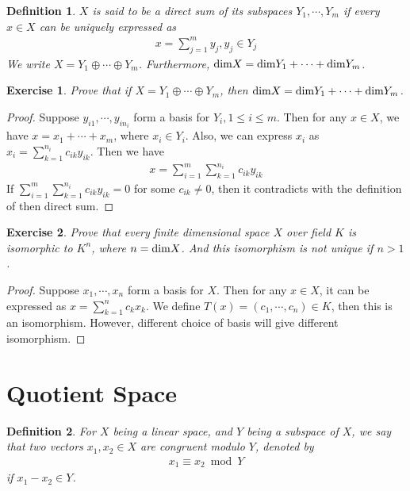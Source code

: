 \documentclass[11pt]{book}
\newtheorem{definition}{Definition}[section]
\newtheorem{exercise}{Exercise}[section]
\theoremstyle{definition}
\numberwithin{equation}{subsection}
\begin{document}
\medskip

\begin{definition}
$X$ is said to be a direct sum of its subspaces $Y_1, \cdots, Y_m$ if every $x\in X$ can be uniquely expressed as
\begin{align*}
    x = \sum^m_{j=1}y_j, y_j\in Y_j
\end{align*}
We write $X = Y_1 \oplus \cdots \oplus Y_m$. Furthermore, ${\rm dim}X = {\rm dim}Y_1 +\cdots + {\rm dim}Y_m$.
\end{definition}

\medskip

\begin{exercise}
Prove that if $X = Y_1 \oplus \cdots \oplus Y_m$, then ${\rm dim}X = {\rm dim}Y_1 +\cdots + {\rm dim}Y_m$.
\end{exercise}
\begin{proof}
Suppose $y_{i1}, \cdots, y_{in_i}$ form a basis for $Y_i, 1\leq i\leq m$. Then for any $x\in X$, we have $x = x_1 +\cdots +x_m$, where $x_i\in Y_i$. Also, we can express $x_i$ as $x_i = \sum^{n_i}_{k=1}c_{i k} y_{i k}$. Then we have 
\begin{align*}
    x = \sum^m_{i=1}\sum^{n_i}_{k=1}c_{i k} y_{i k}
\end{align*}
If $\sum^m_{i=1}\sum^{n_i}_{k=1}c_{i k} y_{i k} = 0$ for some $c_{ik}\neq 0$, then it contradicts with the definition of then direct sum.
\end{proof}

\medskip

\begin{exercise}
Prove that every finite dimensional space $X$ over field $K$ is isomorphic to $K^n$, where $n = {\rm dim}X$. And this isomorphism is not unique if $n > 1$.
\end{exercise}
\begin{proof}
Suppose $x_1,\cdots, x_n$ form a basis for $X$. Then for any $x\in X$, it can be expressed as $x = \sum^n_{k=1}c_k x_k$. We define $T(x) = (c_1, \cdots, c_n)\in K$, then this is an isomorphism. However, different choice of basis will give different isomorphism.
\end{proof}

\medskip

\section{Quotient Space}
\begin{definition}
For $X$ being a linear space, and $Y$ being a subspace of $X$, we say that two vectors $x_1, x_2\in X$ are congruent modulo $Y$, denoted by
\begin{align*}
    x_1 \equiv x_2 \bmod Y
\end{align*}
if $x_1-x_2\in Y$.
\end{definition}
\end{document}
